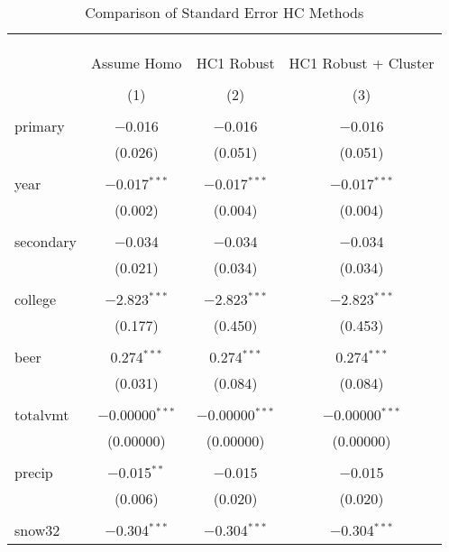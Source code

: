 \documentclass{article}
\begin{document}
\begin{table}[!htbp] \centering 
  \caption{Comparison of Standard Error HC Methods} 
  \label{tab:3a-comp} 
\footnotesize 
\begin{tabular}{@{\extracolsep{5pt}}lccc} 
\\[-1.8ex]\hline 
\hline \\[-1.8ex] 
\\[-1.8ex] & \multicolumn{3}{c}{ } \\ 
 & Assume Homo & HC1 Robust & HC1 Robust + Cluster \\ 
\\[-1.8ex] & (1) & (2) & (3)\\ 
\hline \\[-1.8ex] 
 primary & $-$0.016 & $-$0.016 & $-$0.016 \\ 
  & (0.026) & (0.051) & (0.051) \\ 
  & & & \\ 
 year & $-$0.017$^{***}$ & $-$0.017$^{***}$ & $-$0.017$^{***}$ \\ 
  & (0.002) & (0.004) & (0.004) \\ 
  & & & \\ 
 secondary & $-$0.034 & $-$0.034 & $-$0.034 \\ 
  & (0.021) & (0.034) & (0.034) \\ 
  & & & \\ 
 college & $-$2.823$^{***}$ & $-$2.823$^{***}$ & $-$2.823$^{***}$ \\ 
  & (0.177) & (0.450) & (0.453) \\ 
  & & & \\ 
 beer & 0.274$^{***}$ & 0.274$^{***}$ & 0.274$^{***}$ \\ 
  & (0.031) & (0.084) & (0.084) \\ 
  & & & \\ 
 totalvmt & $-$0.00000$^{***}$ & $-$0.00000$^{***}$ & $-$0.00000$^{***}$ \\ 
  & (0.00000) & (0.00000) & (0.00000) \\ 
  & & & \\ 
 precip & $-$0.015$^{**}$ & $-$0.015 & $-$0.015 \\ 
  & (0.006) & (0.020) & (0.020) \\ 
  & & & \\ 
 snow32 & $-$0.304$^{***}$ & $-$0.304$^{***}$ & $-$0.304$^{***}$ \\ 

\end{tabular}
\end{table}
\end{document}
